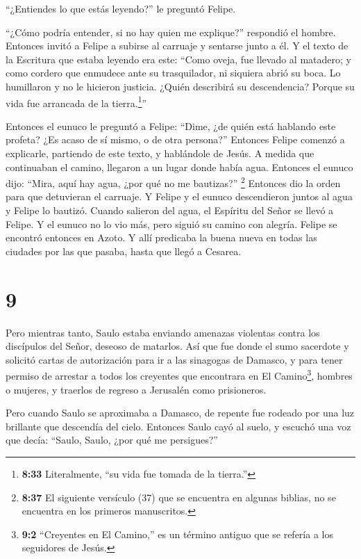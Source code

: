 ``¿Entiendes lo que estás leyendo?'' le preguntó Felipe.

 ``¿Cómo podría entender, si no hay quien me explique?''
respondió el hombre. Entonces invitó a Felipe a subirse al carruaje y
sentarse junto a él.  Y el texto de la Escritura que estaba
leyendo era este: ``Como oveja, fue llevado al matadero; y como cordero
que enmudece ante su trasquilador, ni siquiera abrió su boca.
 Lo humillaron y no le hicieron justicia. ¿Quién describirá
su descendencia? Porque su vida fue arrancada de la tierra.\footnote{\textbf{8:33}
  Literalmente, ``su vida fue tomada de la tierra.''}''

 Entonces el eunuco le preguntó a Felipe: ``Dime, ¿de quién
está hablando este profeta? ¿Es acaso de sí mismo, o de otra persona?''
 Entonces Felipe comenzó a explicarle, partiendo de este
texto, y hablándole de Jesús.  A medida que continuaban el
camino, llegaron a un lugar donde había agua. Entonces el eunuco dijo:
``Mira, aquí hay agua, ¿por qué no me bautizas?'' 
\footnote{\textbf{8:37} El siguiente versículo (37) que se encuentra en
  algunas biblias, no se encuentra en los primeros manuscritos.}
 Entonces dio la orden para que detuvieran el carruaje. Y
Felipe y el eunuco descendieron juntos al agua y Felipe lo bautizó.
 Cuando salieron del agua, el Espíritu del Señor se llevó a
Felipe. Y el eunuco no lo vio más, pero siguió su camino con alegría.
Felipe se encontró entonces en Azoto.  Y allí predicaba la
buena nueva en todas las ciudades por las que pasaba, hasta que llegó a
Cesarea.

\hypertarget{section-8}{%
\section{9}\label{section-8}}

 Pero mientras tanto, Saulo estaba enviando amenazas
violentas contra los discípulos del Señor, deseoso de matarlos. Así que
fue donde el sumo sacerdote  y solicitó cartas de
autorización para ir a las sinagogas de Damasco, y para tener permiso de
arrestar a todos los creyentes que encontrara en El Camino\footnote{\textbf{9:2}
  ``Creyentes en El Camino,'' es un término antiguo que se refería a los
  seguidores de Jesús.}, hombres o mujeres, y traerlos de regreso a
Jerusalén como prisioneros.

 Pero cuando Saulo se aproximaba a Damasco, de repente fue
rodeado por una luz brillante que descendía del cielo. 
Entonces Saulo cayó al suelo, y escuchó una voz que decía: ``Saulo,
Saulo, ¿por qué me persigues?''

